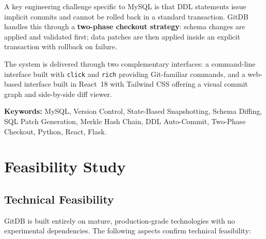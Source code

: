 \documentclass[12pt, a4paper]{article}
\begin{document}
A key engineering challenge specific to MySQL is that DDL statements issue
implicit commits and cannot be rolled back in a standard transaction. GitDB
handles this through a \textbf{two-phase checkout strategy}: schema changes are
applied and validated first; data patches are then applied inside an explicit
transaction with rollback on failure.

The system is delivered through two complementary interfaces: a command-line
interface built with \texttt{click} and \texttt{rich} providing Git-familiar
commands, and a web-based interface built in React~18 with Tailwind CSS offering
a visual commit graph and side-by-side diff viewer.

\medskip
\noindent\textbf{Keywords:} MySQL, Version Control, State-Based Snapshotting,
Schema Diffing, SQL Patch Generation, Merkle Hash Chain, DDL Auto-Commit,
Two-Phase Checkout, Python, React, Flask.

\section{Feasibility Study}

\subsection{Technical Feasibility}

GitDB is built entirely on mature, production-grade technologies with no
experimental dependencies. The following aspects confirm technical feasibility:
\end{document}
